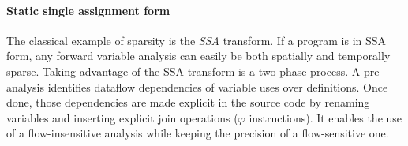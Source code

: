 \documentclass[11pt]{article}
\renewcommand{\phi}{\varphi}
\begin{document}
\paragraph{Static single assignment form} The classical example of sparsity is the \emph{SSA} transform. If a program is in SSA form, any forward variable analysis can easily be both spatially and temporally sparse. Taking advantage of the SSA transform is a two phase process. A pre-analysis identifies dataflow dependencies of variable uses over definitions. Once done, those dependencies are made explicit in the source code by renaming variables and inserting explicit join operations ($\phi$ instructions). It enables the use of a flow-insensitive analysis while keeping the precision of a flow-sensitive one.

\end{document}
